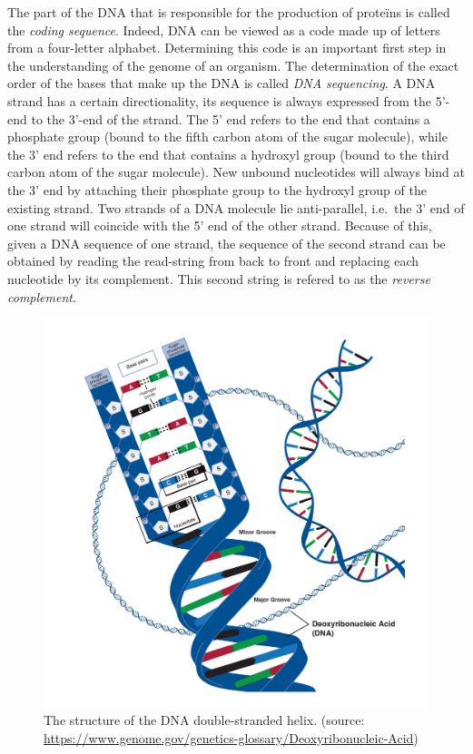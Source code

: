 The part of the DNA that is responsible for the production of prote\"ins is called the \emph{coding sequence}. Indeed, DNA can be viewed as a code made up of letters from a four-letter alphabet. Determining this code is an important first step in the understanding of the genome of an organism. The determination of the exact order of the bases that make up the DNA is called \emph{DNA sequencing}. A DNA strand has a certain directionality, its sequence is always expressed from the 5'-end to the 3'-end of the strand. The 5' end refers to the end that contains a phosphate group (bound to the fifth carbon atom of the sugar molecule), while the 3' end refers to the end that contains a hydroxyl group (bound to the third carbon atom of the sugar molecule). New unbound nucleotides will always bind at the 3' end by attaching their phosphate group to the hydroxyl group of the existing strand.
Two strands of a DNA molecule lie anti-parallel, i.e.\ the 3' end of one strand will coincide with the 5' end of the other strand. Because of this, given a DNA sequence of one strand, the sequence of the second strand can be obtained by reading the read-string from back to front and replacing each nucleotide by its complement. This second string is refered to as the \emph{reverse complement}.

\begin{figure}
\centering
\includegraphics[scale=0.15]{figures/dna_structure.jpg} 
\caption{The structure of the DNA double-stranded helix. (source: \url{https://www.genome.gov/genetics-glossary/Deoxyribonucleic-Acid}) }
\end{figure}

